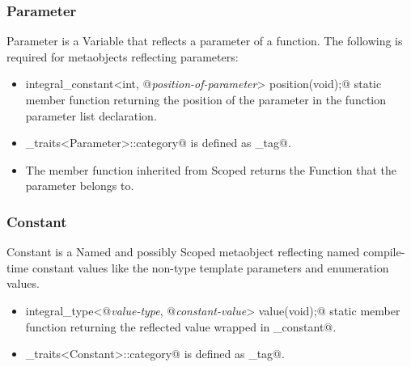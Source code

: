 \subsubsection{Parameter}

{\metaobject Parameter} is a {\metaobject Variable} that reflects a parameter of a function.
The following is required for metaobjects reflecting parameters:

\begin{itemize}
	\item{\verb@static integral_constant<int, @{\em position-of-parameter}\verb@> position(void);@}
	static member function returning the position of the parameter in the function parameter list
	declaration.

	\item \verb@metaobject_traits<Parameter>::category@ is defined as \verb@parameter_tag@.

	\item The \verb@scope@ member function inherited from {\metaobject Scoped} returns
	the {\metaobject Function} that the parameter belongs to.
\end{itemize}

\subsubsection{Constant}

{\metaobject Constant} is a {\metaobject Named} and possibly {\metaobject Scoped} metaobject reflecting
named compile-time constant values like the non-type template parameters and enumeration values.

\begin{itemize}
	\item{\verb@static integral_type<@{\em value-type}\verb@, @{\em constant-value}\verb@> value(void);@}
	static member function returning the reflected value wrapped in \verb@integral_constant@.

	\item \verb@metaobject_traits<Constant>::category@ is defined as \verb@constant_tag@.
\end{itemize}

